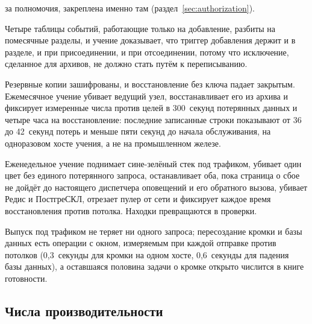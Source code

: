 \begin{description}
    за полномочия, закреплена именно там (раздел~\ref{sec:authorization}). \sImpl
  \item[Разбиение на разделы.] Четыре таблицы событий, работающие только на добавление, разбиты на
    помесячные разделы, и учение доказывает, что триггер добавления держит и в разделе, и при
    присоединении, и при отсоединении, потому что исключение, сделанное для архивов, не должно
    стать путём к переписыванию. \sImpl
  \item[Аварийное восстановление.] Резервные копии зашифрованы, и восстановление без ключа
    падает закрытым. Ежемесячное учение убивает ведущий узел, восстанавливает его из архива и
    фиксирует измеренные числа против целей в 300~секунд потерянных данных и четыре часа на
    восстановление: последние записанные строки показывают от 36 до 42~секунд потерь и меньше пяти
    секунд до начала обслуживания, на одноразовом хосте учения, а не на промышленном железе. \sImpl
  \item[Хаос.] Еженедельное учение поднимает сине-зелёный стек под трафиком, убивает один цвет без
    единого потерянного запроса, останавливает оба, пока страница о сбое не дойдёт до настоящего
    диспетчера оповещений и его обратного вызова, убивает Редис и ПостгреСКЛ, отрезает пулер от сети
    и фиксирует каждое время восстановления против потолка. Находки превращаются в проверки. \sImpl
  \item[Выпуск без простоя.] Выпуск под трафиком не теряет ни одного запроса; пересоздание кромки
    и базы данных есть операции с окном, измеряемым при каждой отправке против потолков
    (0,3~секунды для кромки на одном хосте, 0,6~секунды для падения базы данных), а оставшаяся
    половина задачи о кромке открыто числится в книге готовности. \sImpl
\end{description}

\subsection*{Числа производительности}

